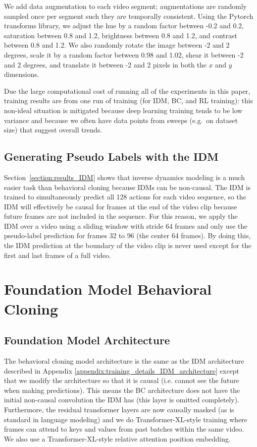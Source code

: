 We add data augmentation to each video segment; augmentations are randomly sampled once per segment such they are temporally consistent. Using the Pytorch\cite{pytorch} transforms library, we adjust the hue by a random factor between -0.2 and 0.2, saturation between 0.8 and 1.2, brightness between 0.8 and 1.2, and contrast between 0.8 and 1.2. We also randomly rotate the image between -2 and 2 degrees, scale it by a random factor between 0.98 and 1.02, shear it between -2 and 2 degrees, and translate it between -2 and 2 pixels in both the $x$ and $y$ dimensions.

Due the large computational cost of running all of the experiments in this paper, training results are from one run of training (for IDM, BC, and RL training): this non-ideal situation is mitigated because deep learning training tends to be low variance \cite{dauphin2014identifying, yosinski2014transferable} and because we often have data points from sweeps (e.g.\ on dataset size) that suggest overall trends.

\subsection{Generating Pseudo Labels with the IDM}
Section~\ref{section:results_IDM} shows that inverse dynamics modeling is a much easier task than behavioral cloning because IDMs can be non-causal. The IDM is trained to simultaneously predict all 128 actions for each video sequence, so the IDM will effectively be causal for frames at the end of the video clip because future frames are not included in the sequence. For this reason, we apply the IDM over a video using a sliding window with stride 64 frames and only use the pseudo-label prediction for frames 32 to 96 (the center 64 frames). By doing this, the IDM prediction at the boundary of the video clip is never used except for the first and last frames of a full video.

\section{Foundation Model Behavioral Cloning}
\subsection{Foundation Model Architecture}
The behavioral cloning model architecture is the same as the IDM architecture described in Appendix \ref{appendix:training_details_IDM_architecture} except that we modify the architecture so that it is causal (i.e. cannot see the future when making predictions). This means the BC architecture does not have the initial non-causal convolution the IDM has (this layer is omitted completely). Furthermore, the residual transformer layers are now causally masked (as is standard in language modeling) and we do Transformer-XL-style\cite{dai2019transformer} training where frames can attend to keys and values from past batches within the same video. We also use a Transformer-XL-style relative attention position embedding.

